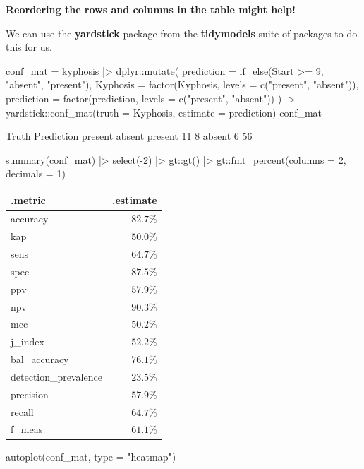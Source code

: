 \documentclass[a4paper]{article}\usepackage[]{graphicx}\usepackage[]{xcolor}
\begin{document}
\begin{greenbox}
	\textbf{Reordering the rows and columns in the table might help!}
\end{greenbox}
We can use the \textbf{yardstick} package from the \textbf{tidymodels} suite of packages to do this for us.
\begin{Schunk}
\begin{Sinput}
conf_mat = kyphosis |> 
  dplyr::mutate(
    prediction = if_else(Start >= 9, 
                         "absent", 
                         "present"),
    Kyphosis = factor(Kyphosis, levels = c("present", "absent")),
    prediction = factor(prediction, levels = c("present", "absent"))
  ) |> 
  yardstick::conf_mat(truth = Kyphosis, estimate = prediction)
conf_mat
\end{Sinput}
\begin{Soutput}
          Truth
Prediction present absent
   present      11      8
   absent        6     56
\end{Soutput}
\begin{Sinput}
summary(conf_mat) |> 
  select(-2) |> 
  gt::gt() |> 
  gt::fmt_percent(columns = 2,
                  decimals = 1)
\end{Sinput}
\begin{longtable}{lr}
\toprule
.metric & .estimate \\ 
\midrule\addlinespace[2.5pt]
accuracy & $82.7\%$ \\ 
kap & $50.0\%$ \\ 
sens & $64.7\%$ \\ 
spec & $87.5\%$ \\ 
ppv & $57.9\%$ \\ 
npv & $90.3\%$ \\ 
mcc & $50.2\%$ \\ 
j\_index & $52.2\%$ \\ 
bal\_accuracy & $76.1\%$ \\ 
detection\_prevalence & $23.5\%$ \\ 
precision & $57.9\%$ \\ 
recall & $64.7\%$ \\ 
f\_meas & $61.1\%$ \\ 
\bottomrule
\end{longtable}
\begin{Sinput}
autoplot(conf_mat, type = "heatmap")
\end{Sinput}



\end{Schunk}
\end{document}
